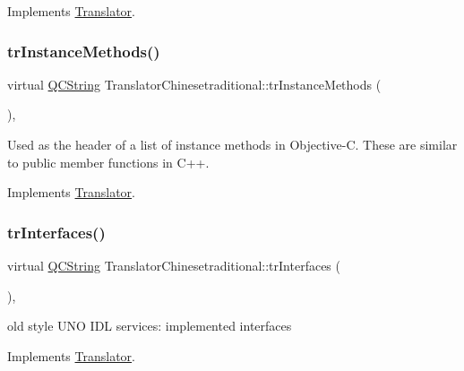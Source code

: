 Implements \mbox{\hyperlink{class_translator}{Translator}}.

\mbox{\label{class_translator_chinesetraditional_afab284f06e27847d9e7644a4fbe58d3a}} 
\subsubsection{\texorpdfstring{trInstanceMethods()}{trInstanceMethods()}}
{\footnotesize\ttfamily virtual \mbox{\hyperlink{class_q_c_string}{Q\+C\+String}} Translator\+Chinesetraditional\+::tr\+Instance\+Methods (\begin{DoxyParamCaption}{ }\end{DoxyParamCaption})\hspace{0.3cm}{\ttfamily [inline]}, {\ttfamily [virtual]}}

Used as the header of a list of instance methods in Objective-\/C. These are similar to public member functions in C++. 

Implements \mbox{\hyperlink{class_translator}{Translator}}.

\mbox{\label{class_translator_chinesetraditional_af2de8c3ebf596f3829145dac56a3931c}} 
\subsubsection{\texorpdfstring{trInterfaces()}{trInterfaces()}}
{\footnotesize\ttfamily virtual \mbox{\hyperlink{class_q_c_string}{Q\+C\+String}} Translator\+Chinesetraditional\+::tr\+Interfaces (\begin{DoxyParamCaption}{ }\end{DoxyParamCaption})\hspace{0.3cm}{\ttfamily [inline]}, {\ttfamily [virtual]}}

old style U\+NO I\+DL services\+: implemented interfaces 

Implements \mbox{\hyperlink{class_translator}{Translator}}.

\mbox{\label{class_translator_chinesetraditional_a895236a1e7edd69286c8e068f4a3037c}} 
